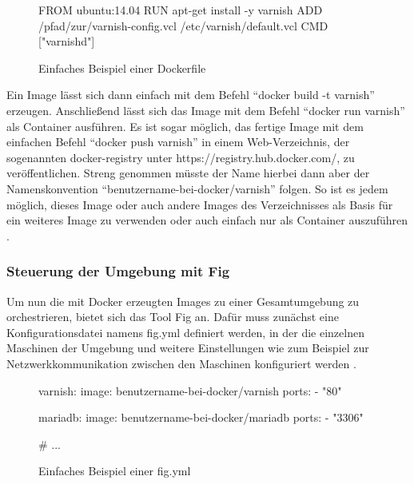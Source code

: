 \begin{figure}[!ht]
  \begin{center}
    \begin{dockercode}
FROM ubuntu:14.04
RUN apt-get install -y varnish
ADD /pfad/zur/varnish-config.vcl /etc/varnish/default.vcl
CMD ["varnishd"]
    \end{dockercode}
    \caption{Einfaches Beispiel einer Dockerfile}
  \end{center}
\end{figure}

Ein Image lässt sich dann einfach mit dem Befehl "`docker build -t varnish"' erzeugen. Anschließend lässt sich das Image mit dem Befehl "`docker run varnish"' als Container ausführen. Es ist sogar möglich, das fertige Image mit dem einfachen Befehl "`docker push varnish"' in einem Web-Verzeichnis, der sogenannten docker-registry unter https://registry.hub.docker.com/, zu veröffentlichen. Streng genommen müsste der Name hierbei dann aber der Namenskonvention "`benutzername-bei-docker/varnish"' folgen. So ist es jedem möglich, dieses Image oder auch andere Images des Verzeichnisses als Basis für ein weiteres Image zu verwenden oder auch einfach nur als Container auszuführen \citep[Vgl][]{docker:004}.

\subsubsection{Steuerung der Umgebung mit Fig}

Um nun die mit Docker erzeugten Images zu einer Gesamtumgebung zu orchestrieren, bietet sich das Tool Fig an. Dafür muss zunächst eine Konfigurationsdatei namens fig.yml definiert werden, in der die einzelnen Maschinen der Umgebung und weitere Einstellungen wie zum Beispiel zur Netzwerkkommunikation zwischen den Maschinen konfiguriert werden \citep[Vgl.][]{docker:006}.

\begin{figure}[!ht]
  \begin{center}
    \begin{yamlcode}
varnish:
  image: benutzername-bei-docker/varnish
  ports:
   - "80"

mariadb:
  image: benutzername-bei-docker/mariadb
  ports:
   - "3306"

# ...
    \end{yamlcode}
    \caption{Einfaches Beispiel einer fig.yml}
  \end{center}
\end{figure}

